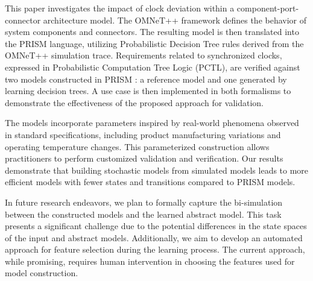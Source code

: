 This paper investigates the impact of clock deviation within a component-port-connector architecture model. The OMNeT++ framework defines the behavior of system components and connectors. The resulting model is then translated into the PRISM language, utilizing Probabilistic Decision Tree rules derived from the OMNeT++ simulation trace. Requirements related to synchronized clocks, expressed in Probabilistic Computation Tree Logic (PCTL), are verified against two models constructed in PRISM : a reference model and one generated by learning decision trees. A use case is then implemented in both formalisms to demonstrate the effectiveness of the proposed approach for validation. 

The models incorporate parameters inspired by real-world phenomena observed in standard specifications, including product manufacturing variations and operating temperature changes. This parameterized construction allows practitioners to perform customized validation and verification. Our results demonstrate that building stochastic models from simulated models leads to more efficient models with fewer states and transitions compared to PRISM models.

In future research endeavors, we plan to formally capture the bi-simulation between the constructed models and the learned abstract model. This task presents a significant challenge due to the potential differences in the state spaces of the input and abstract models. Additionally, we aim to develop an automated approach for feature selection during the learning process. The current approach, while promising, requires human intervention in choosing the features used for model construction. 